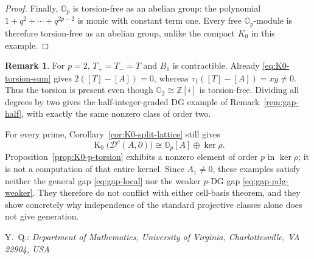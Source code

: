 \documentclass[11pt]{article}
\theoremstyle{definition}
\newtheorem{rem}[thm]{Remark}
\numberwithin{equation}{section}
\newcommand{\K}{\operatorname{K}_0}
\begin{document}
\begin{proof}
Finally, $\mathbb O_p$ is torsion-free as an abelian group: the
polynomial $1+q^2+\cdots+q^{2p-2}$ is monic with constant term one.
Every free $\mathbb O_p$-module is therefore torsion-free as an
abelian group, unlike the compact $K_0$ in this example.
\end{proof}

\begin{rem}
\label{rem:K0-torsion-char2}
For $p=2$, $T_+=T_-=T$ and $B_1$ is contractible.  Already
\eqref{eq:K0-torsion-sum} gives $2([T]-[A])=0$, whereas
$\tau_1([T]-[A])=xy\ne0$.  Thus the torsion is present even though
$\mathbb O_2\cong\mathbb Z[i]$ is torsion-free.  Dividing all
degrees by two gives the half-integer-graded DG example of
Remark~\ref{rem:gap-half}, with exactly the same nonzero class of
order two.

For every prime, Corollary~\ref{cor:K0-split-lattice} still gives
\[
 \K\bigl(\mathcal D^c(A,\partial)\bigr)
 \cong\mathbb O_p[A]\oplus\ker\rho.
\]
Proposition~\ref{prop:K0-p-torsion} exhibits a nonzero element of
order $p$ in $\ker\rho$; it is not a computation of that entire
kernel.  Since $A_1\ne0$, these examples satisfy neither the general
gap \eqref{eq:gap-local} nor the weaker $p$-DG gap
\eqref{eq:gap-pdg-weaker}.  They therefore do not conflict with
either cell-basis theorem, and they show concretely why independence
of the standard projective classes alone does not give generation.
\end{rem}






%



\noindent Y.~Q.: { \sl \small Department of Mathematics, University of Virginia, Charlottesville, VA 22904, USA} \newline {}
\end{document}
